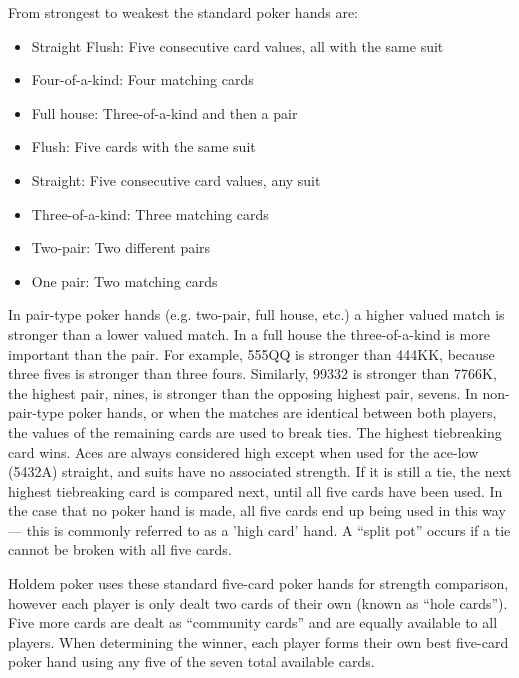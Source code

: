 From strongest to weakest the standard poker hands are:

\begin{itemize}
\singlespacing
\item Straight Flush: Five consecutive card values, all with the same suit
\item Four-of-a-kind: Four matching cards
\item Full house: Three-of-a-kind and then a pair
\item Flush: Five cards with the same suit
\item Straight: Five consecutive card values, any suit
\item Three-of-a-kind: Three matching cards
\item Two-pair: Two different pairs
\item One pair: Two matching cards
\end{itemize}
In pair-type poker hands (e.g. two-pair, full house, etc.) a higher valued match is stronger than a lower valued match.
In a full house the three-of-a-kind is more important than the pair.
For example, 555QQ is stronger than 444KK, because three fives is stronger than three fours.
Similarly, 99332 is stronger than 7766K, the highest pair, nines, is stronger than the opposing highest pair, sevens.
In non-pair-type poker hands, or when the matches are identical between both players, the values of the remaining cards are used to break ties.
The highest tiebreaking card wins.
Aces are always considered high except when used for the ace-low (5432A) straight, and suits have no associated strength.
If it is still a tie, the next highest tiebreaking card is compared next, until all five cards have been used.
In the case that no poker hand is made, all five cards end up being used in this way --- this is commonly referred to as a 'high card' hand.
A ``split pot'' occurs if a tie cannot be broken with all five cards.

Holdem poker uses these standard five-card poker hands for strength comparison, however each player is only dealt two cards of their own (known as ``hole cards'').
Five more cards are dealt as ``community cards'' and are equally available to all players.
When determining the winner, each player forms their own best five-card poker hand using any five of the seven total available cards.


